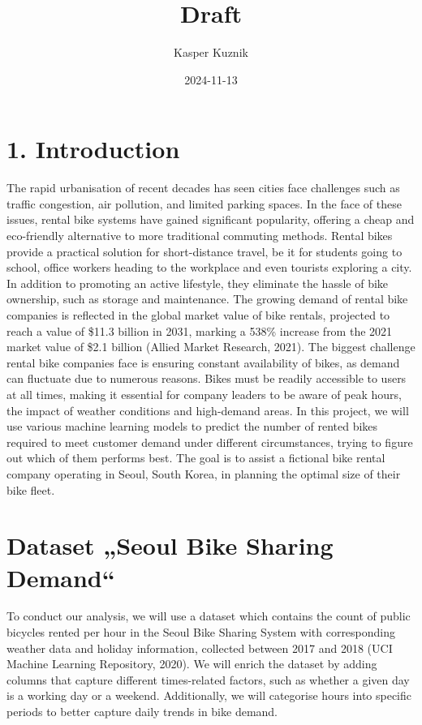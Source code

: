 \documentclass[
]{article}
\title{Draft}
\author{Kasper Kuznik}
\date{2024-11-13}
\begin{document}
\maketitle

\section{1. Introduction}\label{introduction}

The rapid urbanisation of recent decades has seen cities face challenges
such as traffic congestion, air pollution, and limited parking spaces.
In the face of these issues, rental bike systems have gained significant
popularity, offering a cheap and eco-friendly alternative to more
traditional commuting methods. Rental bikes provide a practical solution
for short-distance travel, be it for students going to school, office
workers heading to the workplace and even tourists exploring a city. In
addition to promoting an active lifestyle, they eliminate the hassle of
bike ownership, such as storage and maintenance. The growing demand of
rental bike companies is reflected in the global market value of bike
rentals, projected to reach a value of \$11.3 billion in 2031, marking a
538\% increase from the 2021 market value of \$2.1 billion (Allied
Market Research, 2021). The biggest challenge rental bike companies face
is ensuring constant availability of bikes, as demand can fluctuate due
to numerous reasons. Bikes must be readily accessible to users at all
times, making it essential for company leaders to be aware of peak
hours, the impact of weather conditions and high-demand areas. In this
project, we will use various machine learning models to predict the
number of rented bikes required to meet customer demand under different
circumstances, trying to figure out which of them performs best. The
goal is to assist a fictional bike rental company operating in Seoul,
South Korea, in planning the optimal size of their bike fleet.

\section{Dataset „Seoul Bike Sharing
Demand``}\label{dataset-seoul-bike-sharing-demand}

To conduct our analysis, we will use a dataset which contains the count
of public bicycles rented per hour in the Seoul Bike Sharing System with
corresponding weather data and holiday information, collected between
2017 and 2018 (UCI Machine Learning Repository, 2020). We will enrich
the dataset by adding columns that capture different times-related
factors, such as whether a given day is a working day or a weekend.
Additionally, we will categorise hours into specific periods to better
capture daily trends in bike demand.
\end{document}
